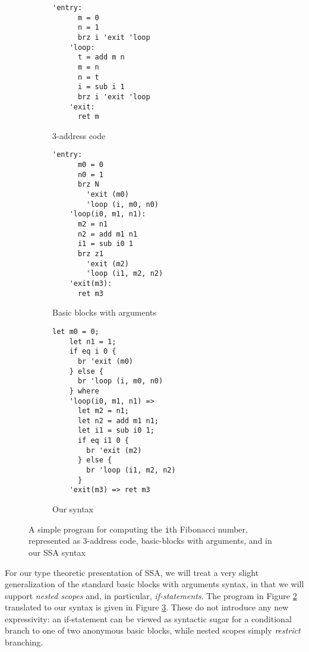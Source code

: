 \documentclass[acmsmall,screen,review]{acmart}
\begin{document}
\begin{figure}
  \centering
  \begin{subfigure}[t]{0.33\textwidth}
    \begin{BVerbatim}[baseline=t, gobble=3]
    'entry:
      m = 0
      n = 1
      brz i 'exit 'loop
    'loop:
      t = add m n
      m = n
      n = t
      i = sub i 1
      brz i 'exit 'loop
    'exit:
      ret m
    \end{BVerbatim}
    \caption{3-address code}
    \label{fig:3-addr}
  \end{subfigure}
  \begin{subfigure}[t]{0.32\textwidth}
    \begin{BVerbatim}[baseline=t, gobble=3]
      'entry:
      m0 = 0
      n0 = 1
      brz N 
        'exit (m0) 
        'loop (i, m0, n0)
    'loop(i0, m1, n1):
      m2 = n1
      n2 = add m1 n1
      i1 = sub i0 1
      brz z1 
        'exit (m2) 
        'loop (i1, m2, n2)
    'exit(m3):
      ret m3
    \end{BVerbatim}
    \caption{Basic blocks with arguments}
    \label{fig:bb-arg}
  \end{subfigure}
  \begin{subfigure}[t]{0.33\textwidth}
    \begin{BVerbatim}[baseline=t, gobble=3]
    let m0 = 0;
    let n1 = 1;
    if eq i 0 {
      br 'exit (m0)
    } else {
      br 'loop (i, m0, n0)
    } where
    'loop(i0, m1, n1) =>
      let m2 = n1;
      let n2 = add m1 n1;
      let i1 = sub i0 1;
      if eq i1 0 {
        br 'exit (m2)
      } else {
        br 'loop (i1, m2, n2)
      }
    'exit(m3) => ret m3
    \end{BVerbatim}
    \caption{Our syntax}
    \label{fig:our-syn}
  \end{subfigure}
  \caption{A simple program for computing the \texttt{i}th Fibonacci number,
  represented as 3-address code, basic-blocks with arguments, and in our SSA
  syntax} 
  \Description{}
  \label{fig:ssa-examples}
\end{figure}

For our type theoretic presentation of SSA, we will treat a very slight
generalization of the standard basic blocks with arguments syntax, in that we
will support \textit{nested scopes} and, in particular, \textit{if-statements}.
The program in Figure \ref{fig:bb-arg} translated to our syntax is given in
Figure \ref{fig:our-syn}. These do not introduce any new expressivity: an
if-statement can be viewed as syntactic sugar for a conditional branch to one of
two anonymous basic blocks, while nested scopes simply \textit{restrict}
branching. 
\end{document}
